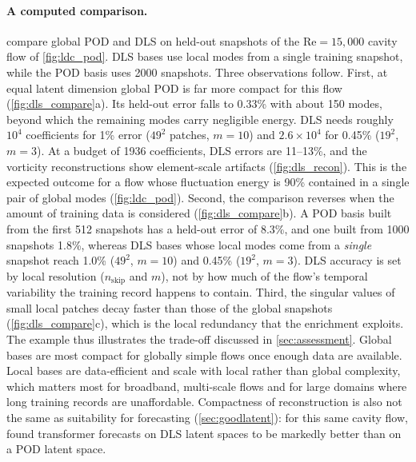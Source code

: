\paragraph{A computed comparison.}
 compare global POD and DLS on held-out
snapshots of the $\mathrm{Re}=15{,}000$ cavity flow of \cref{fig:ldc_pod}.
DLS bases use local modes from a single training snapshot, while the POD basis
uses 2000 snapshots. Three observations follow. First,
at equal latent dimension global POD is far more compact for this flow
(\cref{fig:dls_compare}a). Its held-out error falls to 0.33\% with about 150
modes, beyond which the remaining modes carry negligible energy. DLS needs
roughly $10^{4}$ coefficients for 1\% error ($49^2$ patches, $m=10$) and
$2.6\times10^{4}$ for 0.45\% ($19^2$, $m=3$). At a budget of 1936
coefficients, DLS errors are 11--13\%, and the vorticity reconstructions show
element-scale artifacts (\cref{fig:dls_recon}). This is the expected outcome
for a flow whose fluctuation energy is 90\% contained in a single pair of
global modes (\cref{fig:ldc_pod}). Second, the comparison reverses when the
amount of training data is considered (\cref{fig:dls_compare}b). A POD basis
built from the first 512 snapshots has a held-out error of 8.3\%, and one
built from 1000 snapshots 1.8\%, whereas DLS bases whose local modes come from
a \emph{single} snapshot reach 1.0\% ($49^2$, $m=10$) and 0.45\% ($19^2$,
$m=3$). DLS accuracy is set by local resolution ($n_{\mathrm{skip}}$ and $m$),
not by how much of the flow's temporal variability the training record
happens to contain. Third, the singular values of small local patches decay
faster than those of the global snapshots (\cref{fig:dls_compare}c), which is
the local redundancy that the enrichment exploits. The example thus
illustrates the trade-off discussed in \cref{sec:assessment}. Global bases are
most compact for globally simple flows once enough data are available. Local
bases are data-efficient and scale with local rather than global complexity,
which matters most for broadband, multi-scale flows and for large domains
where long training records are unaffordable. Compactness of reconstruction
is also not the same as suitability for forecasting (\cref{sec:goodlatent}):
for this same cavity flow, \textcite{morton2026scitech} found transformer
forecasts on DLS latent spaces to be markedly better than on a POD latent
space.

